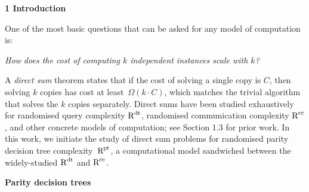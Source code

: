 

\par\medskip\noindent\textbf{
1 Introduction}\par




One of the most basic questions that can be asked for any model of computation is:\par


\emph{How does the cost of computing $k$ independent instances scale with $k$?}\par


A \emph{direct sum} theorem states that if the cost of solving a single copy is $C$, then solving $k$ copies has cost at least $\Omega(k\cdot C)$, which matches the trivial algorithm that solves the $k$ copies separately. Direct sums have been studied exhaustively for randomised query complexity ${\textup{R}}^{\textup{dt}}$, randomised communication complexity ${\textup{R}}^{\textup{cc}}$, and other concrete models of computation; see Section 1.3 for prior work. In this work, we initiate the study of direct sum problems for randomised parity decision tree complexity ${\textup{R}}^{\textup{pt}}$, a computational model sandwiched between the widely-studied ${\textup{R}}^{\textup{dt}}$ and ${\textup{R}}^{\textup{cc}}$.\par




\par\medskip\noindent\textbf{Parity decision trees}\par




